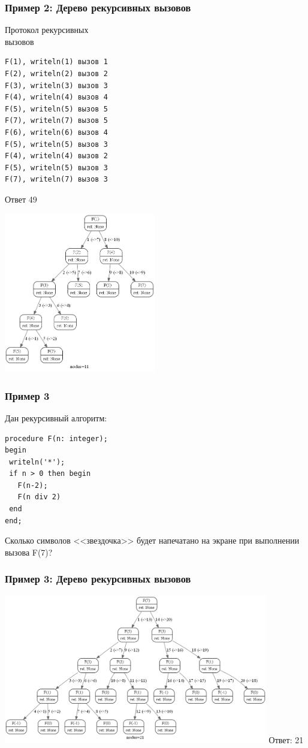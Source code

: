 \begin{frame}[fragile]
\frametitle{Пример 2: Дерево рекурсивных вызовов}

\setlength{\columnsep}{-2cm}
\begin{multicols}{2}
Протокол рекурсивных \\вызовов
\small
\begin{verbatim}
F(1), writeln(1) вызов 1
F(2), writeln(2) вызов 2
F(3), writeln(3) вызов 3
F(4), writeln(4) вызов 4
F(5), writeln(5) вызов 5
F(7), writeln(7) вызов 5
F(6), writeln(6) вызов 4
F(5), writeln(5) вызов 3
F(4), writeln(4) вызов 2
F(5), writeln(5) вызов 3
F(7), writeln(7) вызов 3
\end{verbatim}

Ответ 49


\columnbreak

\includegraphics[height=7cm, left]{images/rec02.png}

\end{multicols}


\end{frame}

\begin{frame}[fragile]
\frametitle{Пример 3}

Дан рекурсивный алгоритм:
\begin{lstlisting}[style=CStyle]
procedure F(n: integer);
begin
 writeln('*');
 if n > 0 then begin
   F(n-2);
   F(n div 2)
 end
end;
\end{lstlisting}
Сколько символов <<звездочка>> будет напечатано на экране при выполнении вызова F(7)?

\end{frame}


\begin{frame}[fragile]
\frametitle{Пример 3: Дерево рекурсивных вызовов}

\includegraphics[height=6.5cm, left]{images/rec03.png}
\pause Ответ: 21
\end{frame}


